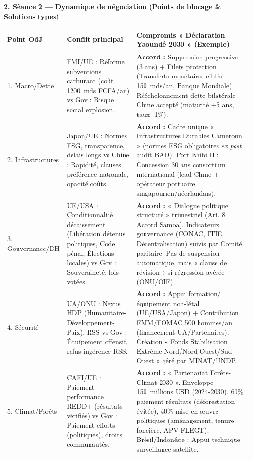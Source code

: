 \documentclass[11pt]{article}
\begin{document}
\begin{exoresolu}
\textbf{2. Séance 2 — Dynamique de négociation (Points de blocage \& Solutions types)}
\begin{center}
\begin{tabularx}{\linewidth}{|l|X|X|}\hline
\textbf{Point OdJ} & \textbf{Conflit principal} & \textbf{Compromis « Déclaration Yaoundé 2030 » (Exemple)} \\ \hline
1. Macro/Dette & FMI/UE : Réforme subventions carburant (coût \SI{1200}{mds} FCFA/an) vs Gov : Risque social explosion. & \textbf{Accord :} Suppression progressive (3 ans) + Filets protection (Transferts monétaires ciblés \SI{150}{mds}/an, Banque Mondiale). Rééchelonnement dette bilatérale Chine accepté (maturité +5 ans, taux -1\%). \\ \hline
2. Infrastructures & Japon/UE : Normes ESG, transparence, délais longs vs Chine : Rapidité, clauses préférence nationale, opacité coûts. & \textbf{Accord :} Cadre unique « Infrastructures Durables Cameroun » (normes ESG obligatoires \emph{ex post} audit BAD). Port Kribi II : Concession 30 ans consortium international (lead Chine + opérateur portuaire singapourien/néerlandais). \\ \hline
3. Gouvernance/DH & UE/USA : Conditionnalité décaissement (Libération détenus politiques, Code pénal, Élections locales) vs Gov : Souveraineté, lois votées. & \textbf{Accord :} « Dialogue politique structuré » trimestriel (Art. 8 Accord Samoa). Indicateurs gouvernance (CONAC, ITIE, Décentralisation) suivis par Comité paritaire. Pas de suspension automatique, mais « clause de révision » si régression avérée (ONU/OIF). \\ \hline
4. Sécurité & UA/ONU : Nexus HDP (Humanitaire-Développement-Paix), RSS vs Gov : Équipement offensif, refus ingérence RSS. & \textbf{Accord :} Appui formation/équipement non-létal (UE/USA/Japon) + Contribution FMM/FOMAC \num{500} hommes/an (financement UA/Partenaires). Création « Fonds Stabilisation Extrême-Nord/Nord-Ouest/Sud-Ouest » géré par MINAT/UNDP. \\ \hline
5. Climat/Forêts & CAFI/UE : Paiement performance REDD+ (résultats vérifiés) vs Gov : Paiement efforts (politiques), droits communautés. & \textbf{Accord :} « Partenariat Forêts-Climat 2030 ». Enveloppe \SI{150}{millions} USD (2024-2030). 60\% paiement résultats (déforestation évitée), 40\% mise en œuvre politiques (aménagement, tenure foncière, APV-FLEGT). Brésil/Indonésie : Appui technique surveillance satellite. \\ \hline
\end{tabularx}
\end{center}


\end{exoresolu}
\end{document}
